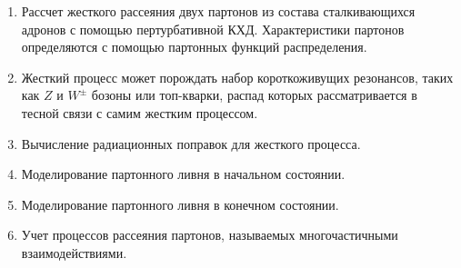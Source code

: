 \begin{enumerate}
	\item Рассчет жесткого рассеяния двух партонов из состава сталкивающихся адронов с помощью пертурбативной КХД. Характеристики партонов определяются с помощью партонных функций распределения.
	
	\item Жесткий процесс может порождать набор короткоживущих резонансов, таких как $Z$ и $W^\pm$ бозоны или топ-кварки, распад которых рассматривается в тесной связи с самим жестким процессом. 
	
	\item Вычисление радиационных поправок для жесткого процесса. %
	
	\item Моделирование партонного ливня в начальном состоянии.
	
	\item Моделирование партонного ливня в конечном состоянии.
	
	\item Учет процессов рассеяния партонов, называемых многочастичными взаимодействиями. %
	
	

\end{enumerate}
